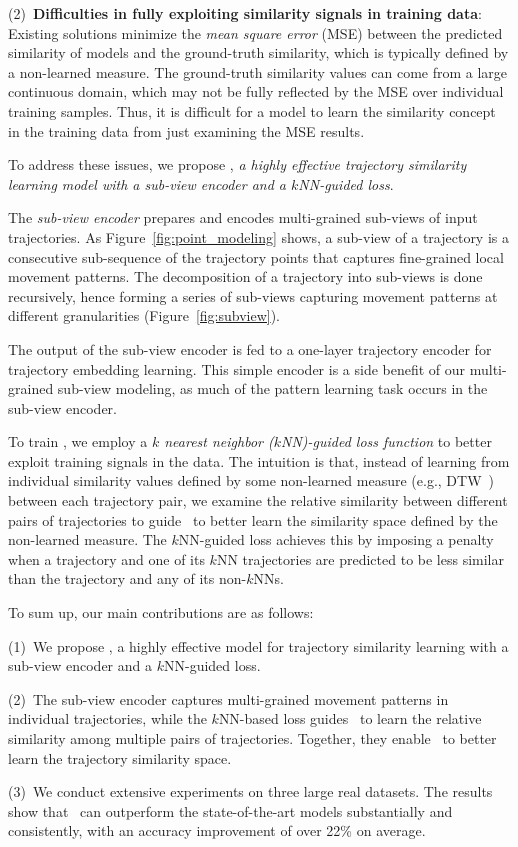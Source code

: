 (2)~\textbf{Difficulties in fully 
exploiting similarity signals in training data}:
Existing solutions minimize the \emph{mean square error} (MSE) between the predicted similarity of models and the ground-truth similarity, which is typically defined by a non-learned measure.  The ground-truth similarity values can come from a large continuous domain, which may not be fully reflected by the MSE over individual training samples. Thus, it is difficult for a model to learn the similarity concept in the training data from just examining the MSE results.


To address these issues, we propose \model, \emph{a highly effective trajectory similarity learning model with a sub-view encoder and a $k$NN-guided loss}. 

The \emph{sub-view encoder} prepares and encodes multi-grained sub-views of input trajectories. 
As Figure~\ref{fig:point_modeling} shows,  
a sub-view of a trajectory is a consecutive sub-sequence of the trajectory points that captures fine-grained local movement patterns. 
The decomposition of a trajectory into sub-views is done recursively, hence forming a series of sub-views capturing  movement patterns at different granularities (Figure~\ref{fig:subview}).

The output of the sub-view encoder is fed to a one-layer trajectory encoder for trajectory embedding learning. 
This simple encoder is a side benefit of our multi-grained sub-view modeling, as much of the pattern learning task occurs in the sub-view encoder.


To train \model, we employ a \emph{$k$ nearest neighbor ($k$NN)-guided loss function} to better exploit training signals in the data. 
The intuition is that, instead of learning from individual similarity values defined by some non-learned measure (e.g., DTW~\cite{dtw}) between each trajectory pair, we examine the relative similarity between different pairs of trajectories to guide \model\ to better learn the similarity space defined by the non-learned measure. 
The $k$NN-guided loss achieves this by imposing a penalty when a trajectory and one of its  $k$NN trajectories are predicted to be less similar than the trajectory and any of its non-$k$NNs.




To sum up, our main contributions are as follows:

(1)~We propose \model, a highly effective model for trajectory similarity learning with a sub-view encoder and a $k$NN-guided loss. 
    
(2)~The sub-view encoder captures multi-grained movement patterns in individual trajectories, while the $k$NN-based loss guides \model\ to learn the  relative similarity among multiple pairs of trajectories. Together, they enable \model\ to better learn the trajectory similarity space. 
    
    
(3)~We conduct extensive experiments on three large real  datasets. The results show that \model\ can outperform the state-of-the-art models substantially and consistently, with an accuracy improvement of over 22\% on average. 
